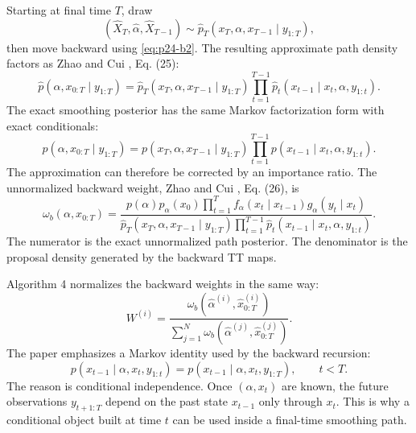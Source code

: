 \documentclass[11pt]{article}
\numberwithin{equation}{section}
\begin{document}
Starting at final time \(T\), draw
\[
    (\widehat X_T,\widehat\alpha,\widehat X_{T-1})
    \sim
    \widehat p_T(x_T,\alpha,x_{T-1}\mid y_{1:T}),
\]
then move backward using \eqref{eq:p24-b2}.  The resulting approximate path density factors
as Zhao and Cui \cite{zhao2024ttsequential}, Eq. (25):
\begin{equation}
    \widehat p(\alpha,x_{0:T}\mid y_{1:T})
    =
    \widehat p_T(x_T,\alpha,x_{T-1}\mid y_{1:T})
    \prod_{t=1}^{T-1}
    \widehat p_t(x_{t-1}\mid x_t,\alpha,y_{1:t}).
    \label{eq:p24-b3}
\end{equation}
The exact smoothing posterior has the same Markov factorization form with exact
conditionals:
\begin{equation}
    p(\alpha,x_{0:T}\mid y_{1:T})
    =
    p(x_T,\alpha,x_{T-1}\mid y_{1:T})
    \prod_{t=1}^{T-1}
    p(x_{t-1}\mid x_t,\alpha,y_{1:t}).
    \label{eq:p24-b4}
\end{equation}
The approximation can therefore be corrected by an importance ratio.  The
unnormalized backward weight, Zhao and Cui \cite{zhao2024ttsequential}, Eq. (26), is
\begin{equation}
    \omega_b(\alpha,x_{0:T})
    =
    \frac{
    p(\alpha)p_\alpha(x_0)
    \prod_{t=1}^{T}
    f_\alpha(x_t\mid x_{t-1})g_\alpha(y_t\mid x_t)}
    {
    \widehat p_T(x_T,\alpha,x_{T-1}\mid y_{1:T})
    \prod_{t=1}^{T-1}
    \widehat p_t(x_{t-1}\mid x_t,\alpha,y_{1:t})}.
    \label{eq:p24-b5}
\end{equation}
The numerator is the exact unnormalized path posterior.  The denominator is the
proposal density generated by the backward TT maps.

Algorithm 4 normalizes the backward weights in the same way:
\begin{equation}
    W^{(i)}
    =
    \frac{\omega_b(\widehat\alpha^{(i)},\widehat x_{0:T}^{(i)})}
    {\sum_{j=1}^{N}\omega_b(\widehat\alpha^{(j)},\widehat x_{0:T}^{(j)})}.
    \label{eq:p24-b6}
\end{equation}
The paper emphasizes a Markov identity used by the backward recursion:
\begin{equation}
    p(x_{t-1}\mid \alpha,x_t,y_{1:t})
    =
    p(x_{t-1}\mid \alpha,x_t,y_{1:T}),
    \qquad t<T.
    \label{eq:p24-b7}
\end{equation}
The reason is conditional independence.  Once \((\alpha,x_t)\) are known, the
future observations \(y_{t+1:T}\) depend on the past state \(x_{t-1}\) only
through \(x_t\).  This is why a conditional object built at time \(t\) can be
used inside a final-time smoothing path.
\end{document}
